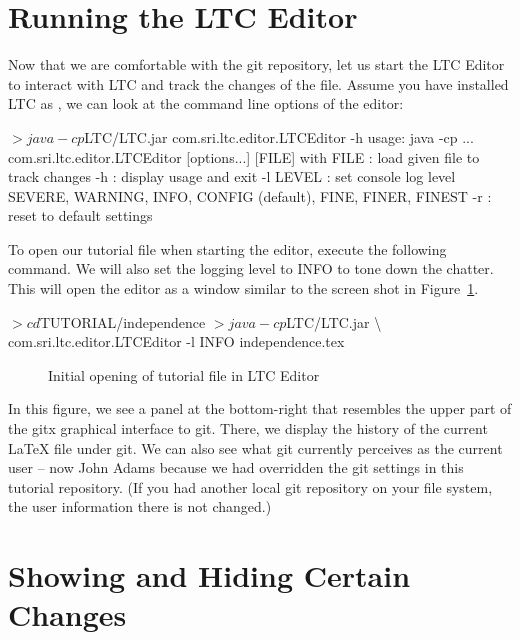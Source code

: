 \section{Running the LTC Editor}

Now that we are comfortable with the git repository, let us start the LTC Editor to interact with LTC and track the changes of the file.  Assume you have installed LTC as , we can look at the command line options of the editor:
\begin{CodeVerbatim}[commandchars=\\\{\}]
$> java -cp $LTC/LTC.jar com.sri.ltc.editor.LTCEditor -h
usage: java -cp ... com.sri.ltc.editor.LTCEditor [options...] [FILE] 
with
 FILE     : load given file to track changes
 -h       : display usage and exit
 -l LEVEL : set console log level
            SEVERE, WARNING, INFO, CONFIG (default), FINE, FINER, FINEST
 -r       : reset to default settings
\end{CodeVerbatim}

To open our tutorial file when starting the editor, execute the following command.  We will also set the logging level to INFO to tone down the chatter.  This will open the editor as a window similar to the screen shot in Figure~\ref{fig:editor-open}.
\begin{CodeVerbatim}[samepage=true,commandchars=\\\{\}]
$> cd $TUTORIAL/independence
$> java -cp $LTC/LTC.jar \textbackslash
   com.sri.ltc.editor.LTCEditor -l INFO independence.tex
\end{CodeVerbatim}
\begin{figure}[t]
\centering
{}
\caption{Initial opening of tutorial file in LTC Editor} \label{fig:editor-open}
\end{figure}
In this figure, we see a panel at the bottom-right that resembles the upper part of the gitx graphical interface to git.  There, we display the history of the current LaTeX file under git.  We can also see what git currently perceives as the current user -- now John Adams because we had overridden the git settings in this tutorial repository.  (If you had another local git repository on your file system, the user information there is not changed.)

\section{Showing and Hiding Certain Changes}

